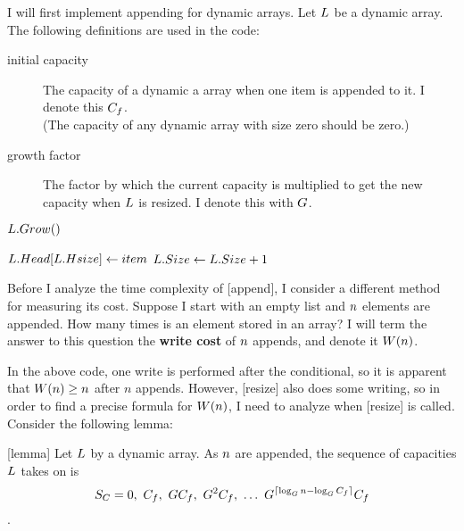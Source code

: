 \dynarrayimpl

I will first implement appending for dynamic arrays. Let $L$ be a dynamic array. The following definitions are used in the code:

\begin{description}
	\item[initial capacity] The capacity of a dynamic a array when one item is appended to it. I denote this $C_f$.\\
	(The capacity of any dynamic array with size zero should be zero.)
	\item[growth factor] The factor by which the current capacity is multiplied to get the new capacity when $L$ is resized. I denote this with $G$.
\end{description}

\begin{algorithm}
	\begin{algorithmic}[1]
				\State $L.Grow()$
			\EndIf
			
			\State $L.Head[L.Hsize] \gets item$
			\State $L.Size \gets L.Size + 1$
		\EndProcedure
	\end{algorithmic}
\end{algorithm}

\tcomplex

Before I analyze the time complexity of [append], I consider a different method for measuring its cost. Suppose I start with an empty list and $n$ elements are appended. How many times is an element stored in an array? I will term the answer to this question the \textbf{write cost} of $n$ appends, and denote it $W(n)$.

In the above code, one write is performed after the conditional, so it is apparent that $W(n) \geq n$ after $n$ appends. However, [resize] also does some writing, so in order to find a precise formula for $W(n)$, I need to analyze when [resize] is called. Consider the following lemma:

[lemma]
Let $L$ by a dynamic array. As $n$ are appended, the sequence of capacities $L$ takes on is $$S_C = 0,\ \initcapacity,\ \growthfactor\initcapacity,\ \growthfactor^2\initcapacity,\ \ldots\ \growthfactor^{\lceil \log_{\growthfactor} \varnitems - \log_{\growthfactor} \initcapacity \rceil}\initcapacity$$.

